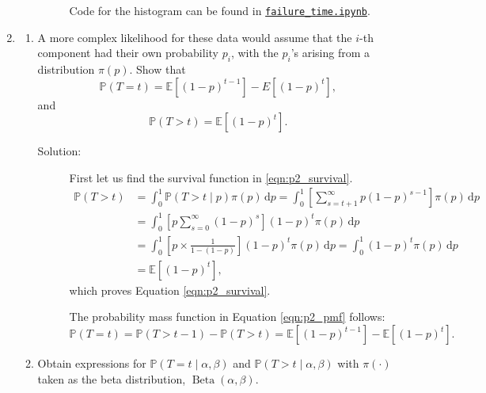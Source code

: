 \documentclass[letterpaper,11pt]{article}
\begin{document}
\begin{enumerate}
\begin{enumerate}
\begin{description}
      Code for the histogram can be found in
      \href{http://nbviewer.jupyter.org/github/ppham27/stat570/blob/master/final/failure\_time.ipynb}{\texttt{failure\_time.ipynb}}.
    \end{description}
  \end{enumerate}
\item
  \begin{enumerate}
  \item A more complex likelihood for these data would assume that the $i$-th
    component had their own probability $p_i$, with the $p_i$'s arising from a
    distribution $\pi\left(p\right)$. Show that
      \begin{equation}
        \mathbb{P}\left(T = t\right) =
        \mathbb{E}\left[(1 - p)^{t-1}\right] -
        E[(1 - p)^t],
        \label{eqn:p2_pmf}
      \end{equation}
      and
      \begin{equation}
        \mathbb{P}\left(T > t\right) = \mathbb{E}\left[(1 - p)^t\right].
        \label{eqn:p2_survival}
      \end{equation}
      \begin{description}
      \item[Solution:] First let us find the survival function in
        \ref{eqn:p2_survival}.
        \begin{align*}
          \mathbb{P}\left(T > t\right)
          &= \int_0^1
          \mathbb{P}\left(T > t \mid p\right)
          \pi\left(p\right)\,\mathrm{d}p 
          = \int_0^1 \left[\sum_{s=t + 1}^\infty p(1 - p)^{s-1}\right]
            \pi\left(p\right)
          \,\mathrm{d}p \\
          &= \int_0^1 \left[p\sum_{s=0}^\infty (1 - p)^s\right]
            (1 - p)^t
            \pi\left(p\right)
            \,\mathrm{d}p \\
          &= \int_0^1 \left[p \times \frac{1}{1 - (1-p)}\right]
            (1 - p)^t
            \pi\left(p\right)
            \,\mathrm{d}p
          = \int_0^1 (1 - p)^t
            \pi\left(p\right)
            \,\mathrm{d}p \\
          &= \mathbb{E}\left[\left(1-p\right)^t\right],
        \end{align*}
        which proves Equation \ref{eqn:p2_survival}.

        The probability mass function in Equation \ref{eqn:p2_pmf} follows:
        \begin{equation*}
          \mathbb{P}\left(T = t\right)
          = \mathbb{P}\left(T > t - 1\right)
          - \mathbb{P}\left(T > t\right)
          = \mathbb{E}\left[\left(1-p\right)^{t-1}\right]
          - \mathbb{E}\left[\left(1-p\right)^{t}\right].
        \end{equation*}
      \end{description}
    \item Obtain expressions for
      $\mathbb{P}\left(T = t \mid \alpha, \beta\right)$ and
      $\mathbb{P}\left(T > t \mid \alpha, \beta\right)$ with
      $\pi\left(\cdot\right)$ taken as the beta distribution,
      $\operatorname{Beta}\left(\alpha, \beta\right)$.


\end{enumerate}
\end{enumerate}
\end{document}
